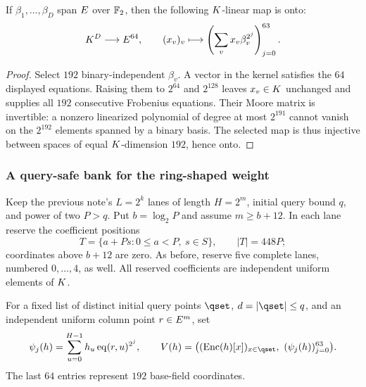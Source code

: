 \begin{lemma}\label{lem:moore}
If $\beta_1,\ldots,\beta_D$ span $E$ over $\mathbb{F}_2$, then the following $K$-linear map is onto:
\[
 K^D\longrightarrow E^{64},\qquad
 (x_v)_v\longmapsto\left(\sum_v x_v\beta_v^{2^j}\right)_{j=0}^{63}.
\]
\end{lemma}
\begin{proof}
Select $192$ binary-independent $\beta_v$. A vector in the kernel satisfies the $64$ displayed equations. Raising them to $2^{64}$ and $2^{128}$ leaves $x_v\in K$ unchanged and supplies all $192$ consecutive Frobenius equations. Their Moore matrix is invertible: a nonzero linearized polynomial of degree at most $2^{191}$ cannot vanish on the $2^{192}$ elements spanned by a binary basis. The selected map is thus injective between spaces of equal $K$-dimension $192$, hence onto.
\end{proof}

\subsubsection{A query-safe bank for the ring-shaped weight}

Keep the previous note's $L=2^k$ lanes of length $H=2^m$, initial query bound $q$, and power of two $P>q$. Put $b=\log_2P$ and assume $m\ge b+12$. In each lane reserve the coefficient positions
\[
 T=\{a+Ps:0\le a<P,\ s\in S\},\qquad |T|=448P;
\]
coordinates above $b+12$ are zero. As before, reserve five complete lanes, numbered $0,\ldots,4$, as well. All reserved coefficients are independent uniform elements of $K$.

For a fixed list of distinct initial query points $\qset$, $d=|\qset|\le q$, and an independent uniform column point $r\in E^m$, set
\[
 \psi_j(h)=\sum_{u=0}^{H-1}h_u\eq(r,u)^{2^j},\qquad
 V(h)=\bigl((\Enc(h)[x])_{x\in\qset},\ (\psi_j(h))_{j=0}^{63}\bigr).
\]
The last $64$ entries represent $192$ base-field coordinates.

